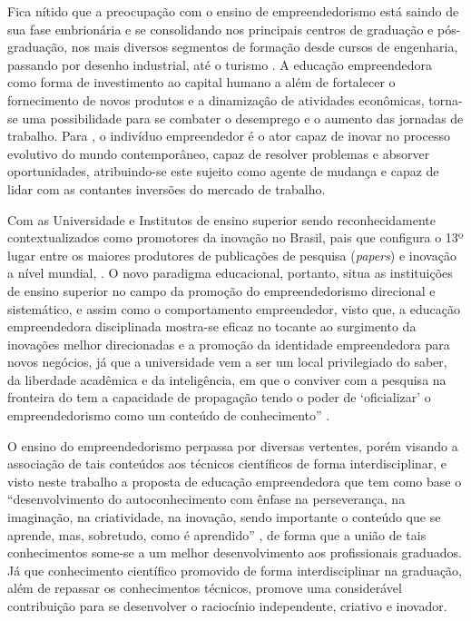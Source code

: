 Fica nítido que a preocupação com o ensino de empreendedorismo está saindo de sua fase embrionária e se consolidando nos principais centros de graduação e pós-graduação, nos mais diversos segmentos de formação desde cursos de engenharia, passando por desenho industrial, até o turismo \cite{henrique_praticas_2008}. A educação empreendedora como forma de investimento ao capital humano a além de fortalecer o fornecimento de novos produtos e a dinamização de atividades  econômicas, torna-se uma possibilidade para se combater o desemprego \cite{morais_empreendedorismo_2018} e o aumento das jornadas de trabalho. Para , o indivíduo empreendedor é o ator capaz de inovar no processo evolutivo do mundo contemporâneo, capaz de resolver problemas e absorver oportunidades, atribuindo-se este sujeito como agente de mudança e capaz de lidar com as contantes inversões do mercado de trabalho. 

Com as Universidade e Institutos de ensino superior sendo reconhecidamente contextualizados como promotores da inovação no  Brasil, pais que configura o 13º lugar entre os maiores produtores de publicações de pesquisa (\textit{papers}) e inovação a nível mundial, .  O novo paradigma educacional, portanto, situa as instituições de ensino superior no campo da promoção do empreendedorismo direcional e sistemático, e assim como o comportamento empreendedor, visto que, a educação empreendedora disciplinada mostra-se eficaz no tocante ao surgimento da inovações melhor direcionadas e a promoção da identidade empreendedora para novos negócios, \cite{jain_academics_2009} já que a universidade vem a ser um local privilegiado do saber, da liberdade acadêmica e da inteligência, em que o conviver com a pesquisa na fronteira do tem a capacidade de propagação tendo o poder de ‘oficializar’ o empreendedorismo como um conteúdo de conhecimento” \cite{dolabela_oficina_2008}. 

O ensino do empreendedorismo perpassa por diversas vertentes, porém visando a associação de tais conteúdos aos técnicos científicos de forma interdisciplinar, e visto neste trabalho a proposta de educação empreendedora que tem como base o “desenvolvimento do autoconhecimento com ênfase na perseverança, na imaginação, na criatividade, na inovação, sendo importante o conteúdo que se aprende, mas, sobretudo, como é aprendido” \cite{souza_disseminacao_2001}, de forma que a união de tais conhecimentos some-se a um melhor desenvolvimento aos profissionais graduados. Já que conhecimento científico promovido de forma interdisciplinar na graduação, além de repassar os conhecimentos técnicos, promove  uma considerável contribuição para se desenvolver o raciocínio independente, criativo e inovador.

